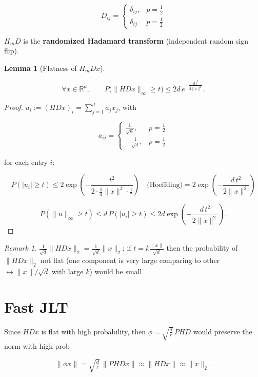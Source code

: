 \documentclass[
  letterpaper,
  DIV=11,
  numbers=noendperiod]{scrreprt}
\theoremstyle{definition}
\theoremstyle{plain}
\theoremstyle{plain}
\theoremstyle{definition}
\theoremstyle{plain}
\theoremstyle{plain}
\newtheorem{lemma}{Lemma}[chapter]
\theoremstyle{remark}
\newtheorem*{remark}{Remark}
\begin{document}
\[
D_{ij} = \begin{cases} \delta_{ij}, & p = \tfrac{1}{2} \\[4pt] \delta_{ij} & p = \tfrac{1}{2} \end{cases}
\]

\(H_m D\) is the \textbf{randomized Hadamard transform} (independent
random sign flip).

\begin{lemma}[Flatness of
\(H_m D x\)]\protect\hypertarget{lem-hadamard-flat}{}\label{lem-hadamard-flat}

\[
\forall x \in \mathbb{R}^d, \qquad P\big(\|H D x\|_\infty \ge t\big) \le 2d\, e^{-\frac{d\, t^2}{2\|x\|^2}}.
\]

\end{lemma}

\begin{proof}
\(u_i := (H D x)_i=\sum_{j=1}^da_jx_j\), with

\[
a_{ij} = \begin{cases} \tfrac{1}{\sqrt{d}}, & p = \tfrac{1}{2} \\ -\tfrac{1}{\sqrt{d}}, & p = \tfrac{1}{2} \end{cases}
\]

for each entry \(i\):

\[
P(|u_i| \ge t) \le 2 \exp\!\left(-\frac{t^2}{2 \cdot \frac{1}{d}\|x\|^2 \cdot \tfrac{1}{?}}\right)
\quad \text{(Hoeffding)}
= 2 \exp\!\left(-\frac{d\, t^2}{2\|x\|^2}\right)
\]

\[
P(\|u\|_\infty \ge t) \le d\, P(|u_i| \ge t) \le 2d \exp\!\left(-\frac{d\, t^2}{2\|x\|^2}\right).
\]
\end{proof}

\begin{remark}
\(\frac{1}{\sqrt{d}}\|H D x\|_2 = \frac{1}{\sqrt{d}}\|x\|_2\); if
\(t = k \frac{\|x\|}{\sqrt{d}}\) then the probability of \(\|H D x\|_2\)
not flat (one component is very large comparing to other
\(\leftrightarrow \|x\|/\sqrt{d}\) with large \(k\)) would be small.
\end{remark}

\section{Fast JLT}\label{fast-jlt}

Since \(H D x\) is flat with high probability, then
\(\phi = \sqrt{\tfrac{d}{r}}\, P H D\) would preserve the norm with high
prob

\[
\|\phi x\| = \sqrt{\tfrac{d}{r}}\,\|P H D x\| \approx \|H D x\| \approx \|x\|_2 .
\]
\end{document}
